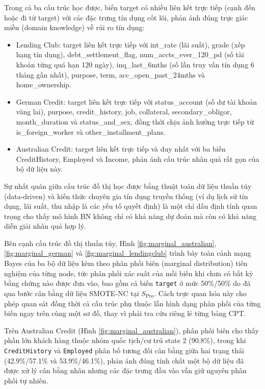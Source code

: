 Trong cả ba cấu trúc học được, biến target có nhiều liên kết trực tiếp (cạnh đến hoặc đi từ target) với các đặc trưng tín dụng cốt lõi, phản ánh đúng trực giác miền (domain knowledge) về rủi ro tín dụng:

\begin{itemize}
    \item Lending Club: target liên kết trực tiếp với int\_rate (lãi suất), grade (xếp hạng tín dụng), debt\_settlement\_flag, num\_accts\_ever\_120\_pd (số tài khoản từng quá hạn 120 ngày), inq\_last\_6mths (số lần truy vấn tín dụng 6 tháng gần nhất), purpose, term, acc\_open\_past\_24mths và home\_ownership.
    
    \item German Credit: target liên kết trực tiếp với status\_account (số dư tài khoản vãng lai), purpose, credit\_history, job, collateral, secondary\_obligor, month\_duration và status\_and\_sex, đồng thời chịu ảnh hưởng trực tiếp từ is\_foreign\_worker và other\_installment\_plans.

    \item Australian Credit: target liên kết trực tiếp và duy nhất với ba biến CreditHistory, Employed và Income, phản ánh cấu trúc nhân quả rất gọn của bộ dữ liệu này.
\end{itemize}

Sự nhất quán giữa cấu trúc đồ thị học được bằng thuật toán dữ liệu thuần túy (data-driven) và kiến thức chuyên gia tín dụng truyền thống (ví dụ lịch sử tín dụng, lãi suất, thu nhập là các yếu tố quyết định) là một chỉ dấu định tính quan trọng cho thấy mô hình BN không chỉ có khả năng dự đoán mà còn có khả năng diễn giải nhân quả hợp lý.

Bên cạnh cấu trúc đồ thị thuần túy, Hình \ref{fig:marginal_australian}, \ref{fig:marginal_german} và \ref{fig:marginal_lendingclub}  trình bày toàn cảnh mạng Bayes của ba bộ dữ liệu kèm theo phân phối biên (marginal distribution) tiên nghiệm của từng node, tức phân phối xác suất của mỗi biến khi chưa có bất kỳ bằng chứng nào được đưa vào, bao gồm cả biến \texttt{target} ở mức 50\%/50\% do đã qua bước cân bằng dữ liệu SMOTE-NC tại $S_{\text{Pro}}$. Cách trực quan hóa này cho phép quan sát đồng thời cả cấu trúc phụ thuộc lẫn hình dạng phân phối của từng biến ngay trên cùng một sơ đồ, thay vì phải tra cứu riêng lẻ từng bảng CPT.

Trên Australian Credit (Hình \ref{fig:marginal_australian}), phân phối biên cho thấy phần lớn khách hàng thuộc nhóm quốc tịch/cư trú state 2 (90.8\%), trong khi \texttt{CreditHistory} và \texttt{Employed} phân bố tương đối cân bằng giữa hai trạng thái (42.9\%/57.1\% và 53.9\%/46.1\%), phản ánh đúng tính chất một bộ dữ liệu đã được xử lý cân bằng nhãn nhưng các đặc trưng đầu vào vẫn giữ nguyên phân phối tự nhiên.

